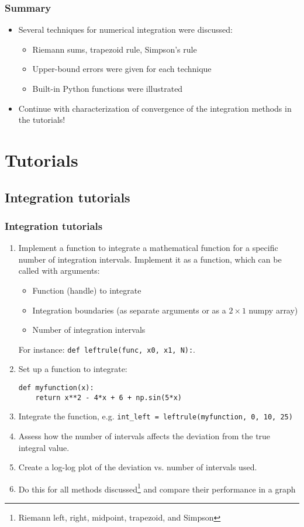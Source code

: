 \begin{frame}
  \frametitle{Summary}
  \begin{itemize}
    \item Several techniques for numerical integration were discussed:
    \begin{itemize}
      \item Riemann sums, trapezoid rule, Simpson's rule
      \item Upper-bound errors were given for each technique
      \item Built-in Python functions were illustrated
    \end{itemize}
    \item Continue with characterization of convergence of the integration methods in the tutorials!
  \end{itemize}
\end{frame}

\section{Tutorials}
\subsection*{Integration tutorials}
{\nologo
\begin{frame}[fragile]
  \frametitle{Integration tutorials}
  \begin{enumerate}
    \item Implement a function to integrate a mathematical function for a specific number of integration intervals. Implement it as a function, which can be called with arguments:
    \begin{itemize}
      \item Function (handle) to integrate
      \item Integration boundaries (as separate arguments or as a $2 \times 1$ numpy array)
      \item Number of integration intervals
    \end{itemize}
    For instance: \lstinline$def leftrule(func, x0, x1, N):$.\\
    \item Set up a function to integrate:
    \begin{lstlisting}
def myfunction(x):
    return x**2 - 4*x + 6 + np.sin(5*x)
    \end{lstlisting}
    \item Integrate the function, e.g. \lstinline$int_left = leftrule(myfunction, 0, 10, 25)$
    \item Assess how the number of intervals affects the deviation from the true integral value. 
    \item Create a log-log plot of the deviation vs. number of intervals used.
    \item Do this for all methods discussed\footnote{Riemann left, right, midpoint, trapezoid, and Simpson} and compare their performance in a graph
  \end{enumerate}
\end{frame}
}
